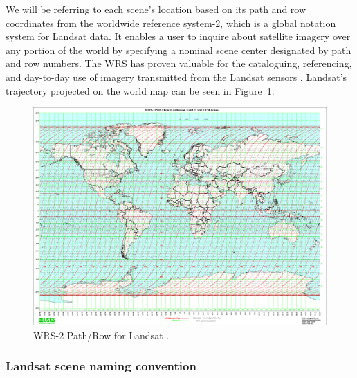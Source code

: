 \documentclass[11pt, a4paper]{report}
\begin{document}
	We will be referring to each scene's location based on its path and row coordinates from the worldwide reference system-2, which is a global notation system for Landsat data. It enables a user to inquire about satellite imagery over any portion of the world by specifying a nominal scene center designated by path and row numbers. The WRS has proven valuable for the cataloguing, referencing, and day-to-day use of imagery transmitted from the Landsat sensors \cite{wrs}. Landsat's trajectory projected on the world map can be seen in Figure~\ref{fig:wrs2}.
	\begin{figure}[h]
		\centering
		\includegraphics[scale=0.2]{../images/wrs2.png}
		\caption{WRS-2 Path/Row for Landsat \cite{wrs}.}
		\label{fig:wrs2}
	\end{figure}
	
	\subsubsection{Landsat scene naming convention}
	\label{seq:landsat_naming}
	
\end{document}
